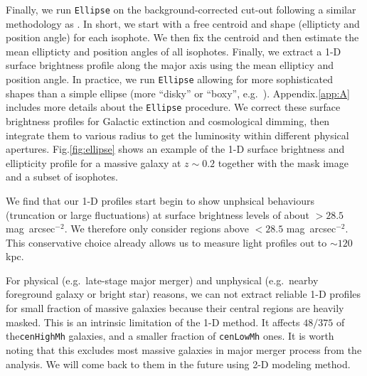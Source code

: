 \documentclass{emulateapj}
\def\sb{mag~arcsec$^{-2}$}
\def\rbcg{\texttt{cenHighMh}}
\def\nbcg{\texttt{cenLowMh}}
\begin{document}
\begin{CJK*}{UTF8}{gbsn}
    
    
    
    Finally, we run \texttt{Ellipse} on the background-corrected cut-out following a similar methodology as \citep{Li2012}. In short, we start with a free centroid and shape (ellipticty and position angle) for each isophote. We then fix the centroid and then estimate the mean ellipticty and position angles of all isophotes.  Finally, we extract a 1-D surface brightness profile along the major axis using the mean ellipticy and position angle. In practice, we run \texttt{Ellipse} allowing for more sophisticated shapes than a simple ellipse (more ``disky'' or ``boxy'', e.g.\ \citealt{Kormendy2009}). Appendix.\ref{app:A} includes more details about the \texttt{Ellipse} procedure. We correct these surface brightness profiles for Galactic extinction and 
    cosmological dimming, then integrate them to various radius to get the 
    luminosity within different physical apertures. Fig.\ref{fig:ellipse} shows an example of the 1-D surface brightness and 
    ellipticity profile for a massive galaxy at $z\sim0.2$ together with the mask image and a subset of isophotes.  
        

    We find that our 1-D profiles start begin to show unphsical behaviours (truncation or large fluctuations) at surface brightness levels of about $>28.5$ \sb. We therefore only consider regions above $<28.5$ \sb. 
    This conservative choice already allows us to measure light profiles out to $\sim 120$ kpc. 
    
    
    For physical (e.g.\ late-stage major merger) and unphysical (e.g.\ nearby 
    foreground galaxy or bright star) reasons, we can not extract reliable 1-D 
    profiles for small fraction of massive galaxies because their central regions are heavily masked. This is an intrinsic limitation of the 1-D method. 
    It affects $48/375$ of the\rbcg{} galaxies, and a smaller fraction of \nbcg{} ones. 
    It is worth noting that this excludes most massive galaxies in major merger 
    process from the analysis. 
    We will come back to them in the future using 2-D modeling method.
    

\end{CJK*}
\end{document}
